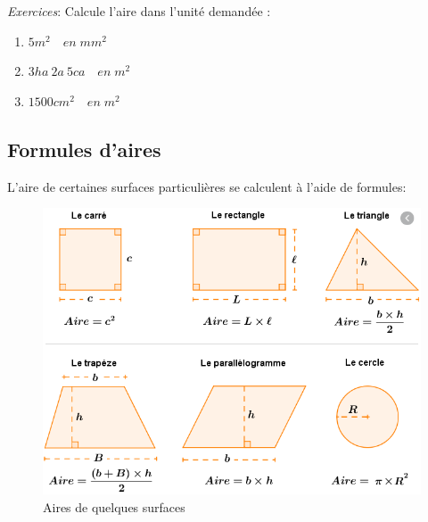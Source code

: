 \documentclass[utf8, a4paper, 12 pt]{article}
\begin{document}
            \emph{Exercices}:
            Calcule l'aire dans l'unité demandée : 
            \begin{enumerate}[label = \Alph*) ]
                \item $5 m^2 \quad en\; mm^2$
                \item $3 ha~2 a~5 ca \quad en \; m^2$
                \item $1500 cm^2 \quad en \; m^2$
            \end{enumerate}

        \subsection{Formules d'aires}
        L'aire de certaines surfaces particulières se calculent à l'aide de formules:
            \begin{figure}[H]
                \centering
                \includegraphics[width=0.9\linewidth]{img/formuleAires.PNG}
                \caption{Aires de quelques surfaces}
            \end{figure}
\end{document}
